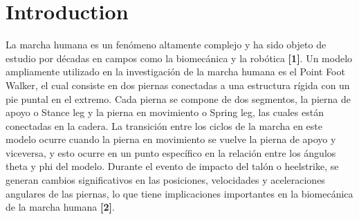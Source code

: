 \documentclass[journal,transmag]{IEEEtran}
\begin{document}
\section{Introduction}
La marcha humana es un fenómeno altamente complejo y ha sido objeto de estudio por décadas en campos como la biomecánica y la robótica \textbf{[1]}. Un modelo ampliamente utilizado en la investigación de la marcha humana es el Point Foot Walker, el cual consiste en dos piernas conectadas a una estructura rígida con un pie puntal en el extremo. Cada pierna se compone de dos segmentos, la pierna de apoyo o Stance leg y la pierna en movimiento o Spring leg, las cuales están conectadas en la cadera. La transición entre los ciclos de la marcha en este modelo ocurre cuando la pierna en movimiento se vuelve la pierna de apoyo y viceversa, y esto ocurre en un punto específico en la relación entre los ángulos theta y phi del modelo. Durante el evento de impacto del talón o heelstrike, se generan cambios significativos en las posiciones, velocidades y aceleraciones angulares de las piernas, lo que tiene implicaciones importantes en la biomecánica de la marcha humana \textbf{[2]}. 
	
\end{document}
